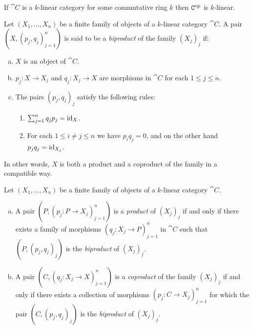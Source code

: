 \begin{corollary}
\label{cor:opposite-category-k-linear}
If \(\cat C\) is a \(k\)-linear category for some commutative ring \(k\) then
\(\texttt C^{\mathrm{op}}\) is \(k\)-linear.
\end{corollary}

\begin{definition}[Biproduct]
\label{def:biproduct}
Let \((X_1, \dots, X_n)\) be a finite family of objects of a \(k\)-linear
category \(\cat C\). A pair \((X, (p_j, q_j)_{j=1}^n)\) is said to be a
\emph{biproduct} of the family \((X_j)_j\) if:
\begin{enumerate}[(a)]\setlength\itemsep{0em}
\item \(X\) is an object of \(\cat C\).

\item \(p_j: X \to X_j\) and \(q_j: X_j \to X\) are morphisms in \(\cat C\) for each
  \(1 \leq j \leq n\).

\item The pairs \((p_j, q_j)_j\) satisfy the following rules:
  \begin{enumerate}[(1)]\setlength\itemsep{0em}
  \item \(\sum_{j=1}^n q_j p_j = \operatorname{id}_X\).
  \item For each \(1 \leq i \neq j \leq n\) we have \(p_i q_j = 0\), and on the other
    hand \(p_j q_j = \operatorname{id}_{X_j}\).
  \end{enumerate}
\end{enumerate}
In other words, \(X\) is both a product and a coproduct of the family in a
compatible way.
\end{definition}

\begin{theorem}
\label{thm:product-iff-admits-biproduct}
Let \((X_1, \dots, X_n)\) be a finite family of objects of a \(k\)-linear
category \(\cat C\).
\begin{enumerate}[(a)]\setlength\itemsep{0em}
\item A pair \((P, (p_j: P \to X_j)_{j=1}^n)\) is a \emph{product} of
  \((X_j)_j\) if and only if there exists a family of morphisms
  \((q_j: X_j \to P)_{j=1}^n\) in \(\cat C\) such that \((P, (p_j, q_j)_j)\) is
  the \emph{biproduct} of \((X_j)_j\).

\item A pair \((C, (q_j: X_j \to X)_{j=1}^n)\) is a \emph{coproduct} of the family
  \((X_j)_j\) if and only if there exists a collection of morphisms
  \((p_j: C \to X_j)_{j=1}^n\) for which the pair \((C, (p_j, q_j)_j)\) is the
  \emph{biproduct} of \((X_j)_j\).
\end{enumerate}
\end{theorem}

